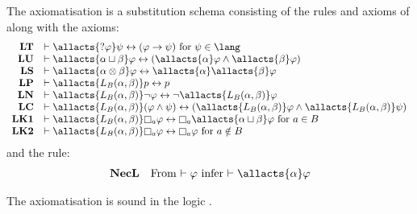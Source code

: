 \begin{definition}\label{afl-k-axioms}
    The axiomatisation \axiomAflK{} is a substitution schema consisting of the rules and axioms of \axiomK{} along with the axioms:
    $$
    \begin{array}{rl}
        {\bf LT} & \proves \allacts{\test{\phi}} \psi \iff (\phi \implies \psi) \text{ for } \psi \in \lang\\
        {\bf LU} & \proves \allacts{\alpha \choice \beta} \phi \iff (\allacts{\alpha} \phi \land \allacts{\beta} \phi)\\
        {\bf LS} & \proves \allacts{\alpha \compose \beta} \phi \iff \allacts{\alpha} \allacts{\beta} \phi\\
        {\bf LP} & \proves \allacts{\learns_\agentsB (\alpha, \beta)} \atomP \iff \atomP\\
        {\bf LN} & \proves \allacts{\learns_\agentsB (\alpha, \beta)} \neg \phi \iff \neg \allacts{\learns_\agentsB (\alpha, \beta)} \phi\\
        {\bf LC} & \proves \allacts{\learns_\agentsB (\alpha, \beta)} (\phi \land \psi) \iff (\allacts{\learns_\agentsB (\alpha, \beta)} \phi \land \allacts{\learns_\agentsB (\alpha, \beta)} \psi)\\
        {\bf LK1} & \proves \allacts{\learns_\agentsB (\alpha, \beta)} \necessary[\agentA] \phi \iff \necessary[\agentA] \allacts{\alpha \choice \beta} \phi \text{ for } \agentA \in \agentsB\\
        {\bf LK2} & \proves \allacts{\learns_\agentsB (\alpha, \beta)} \necessary[\agentA] \phi \iff \necessary[\agentA] \phi \text{ for } \agentA \notin \agentsB
    \end{array}
    $$
    and the rule:
    $$
    \begin{array}{rl}
        {\bf NecL} & \text{From $\proves \phi$ infer $\proves \allacts{\alpha} \phi$}
    \end{array}
    $$
\end{definition}

\begin{proposition}\label{afl-k-axioms-soundness}
    The axiomatisation \axiomAflK{} is sound in the logic \logicAmlK{}.
\end{proposition}

